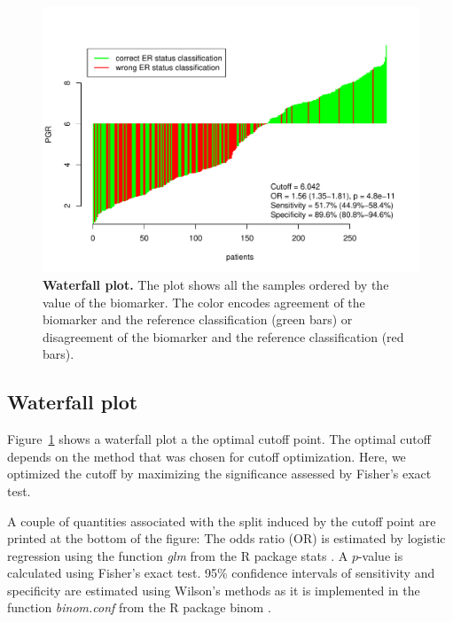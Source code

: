 \documentclass[12pt, a4paper]{article}
\begin{document}
\begin{figure}[t]
\centering
\includegraphics{Cutoff_Finder_manual-007}
\caption{\textbf{Waterfall plot.}
The plot shows all the samples ordered by the value of the biomarker.
The color encodes agreement of the biomarker and the reference classification (green bars)
or disagreement of the biomarker and the reference classification (red bars).}
\label{fig:waterfall}
\end{figure}

\subsection{Waterfall plot}
Figure~\ref{fig:waterfall} shows a waterfall plot a the optimal cutoff point.
The optimal cutoff depends on the method that was chosen for cutoff optimization.
Here, we optimized the cutoff by maximizing the significance assessed by Fisher's exact test.

A couple of quantities associated with the split induced by the cutoff point are printed at the bottom of the figure:
The odds ratio (OR) is estimated by logistic regression using the function \emph{glm} from the R package stats \cite{R}.
A $p$-value is calculated using Fisher's exact test.
95\% confidence intervals of sensitivity and specificity are estimated using Wilson's methods as it is implemented in the function \emph{binom.conf} from the R package binom \cite{binom}.

\newpage
\end{document}
